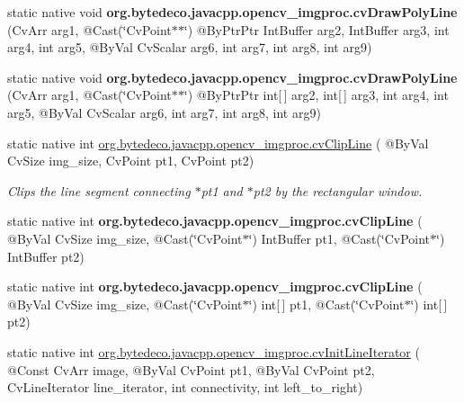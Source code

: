 \begin{DoxyCompactItemize}
\item 
\mbox{\label{group__imgproc__c_gafa6e34fd670bde756cfd9c1264cb70a3}} 
static native void {\bfseries org.\+bytedeco.\+javacpp.\+opencv\+\_\+imgproc.\+cv\+Draw\+Poly\+Line} (Cv\+Arr arg1, @Cast(\char`\"{}Cv\+Point$\ast$$\ast$\char`\"{}) @By\+Ptr\+Ptr Int\+Buffer arg2, Int\+Buffer arg3, int arg4, int arg5, @By\+Val Cv\+Scalar arg6, int arg7, int arg8, int arg9)
\item 
\mbox{\label{group__imgproc__c_ga28ce154e0bad4854b8800cbb5a1e3335}} 
static native void {\bfseries org.\+bytedeco.\+javacpp.\+opencv\+\_\+imgproc.\+cv\+Draw\+Poly\+Line} (Cv\+Arr arg1, @Cast(\char`\"{}Cv\+Point$\ast$$\ast$\char`\"{}) @By\+Ptr\+Ptr int\mbox{[}$\,$\mbox{]} arg2, int\mbox{[}$\,$\mbox{]} arg3, int arg4, int arg5, @By\+Val Cv\+Scalar arg6, int arg7, int arg8, int arg9)
\item 
static native int \hyperlink{group__imgproc__c_ga1bff7c65c8a997286cfb28f978c3d9f4}{org.\+bytedeco.\+javacpp.\+opencv\+\_\+imgproc.\+cv\+Clip\+Line} ( @By\+Val Cv\+Size img\+\_\+size, Cv\+Point pt1, Cv\+Point pt2)
\begin{DoxyCompactList}\small\item\em Clips the line segment connecting $\ast$pt1 and $\ast$pt2 by the rectangular window. \end{DoxyCompactList}\item 
\mbox{\label{group__imgproc__c_ga14df30508aae8a515bedb686b6112113}} 
static native int {\bfseries org.\+bytedeco.\+javacpp.\+opencv\+\_\+imgproc.\+cv\+Clip\+Line} ( @By\+Val Cv\+Size img\+\_\+size, @Cast(\char`\"{}Cv\+Point$\ast$\char`\"{}) Int\+Buffer pt1, @Cast(\char`\"{}Cv\+Point$\ast$\char`\"{}) Int\+Buffer pt2)
\item 
\mbox{\label{group__imgproc__c_gad9eef2d07c9107b248c749aa1bcc4fbc}} 
static native int {\bfseries org.\+bytedeco.\+javacpp.\+opencv\+\_\+imgproc.\+cv\+Clip\+Line} ( @By\+Val Cv\+Size img\+\_\+size, @Cast(\char`\"{}Cv\+Point$\ast$\char`\"{}) int\mbox{[}$\,$\mbox{]} pt1, @Cast(\char`\"{}Cv\+Point$\ast$\char`\"{}) int\mbox{[}$\,$\mbox{]} pt2)
\item 
static native int \hyperlink{group__imgproc__c_gac6827dd42663e5c95d5c78bd9bce2470}{org.\+bytedeco.\+javacpp.\+opencv\+\_\+imgproc.\+cv\+Init\+Line\+Iterator} ( @Const Cv\+Arr image, @By\+Val Cv\+Point pt1, @By\+Val Cv\+Point pt2, Cv\+Line\+Iterator line\+\_\+iterator, int connectivity, int left\+\_\+to\+\_\+right)

\end{DoxyCompactItemize}
